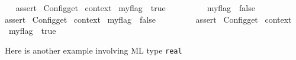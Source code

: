 \begin{isabellebody}
%
\isadelimML
\isanewline
%
\endisadelimML
%
\isatagML
{}\isamarkupfalse%
\ {}\ %
\isaantiq
assert{}%
\endisaantiq
\ {}Config{}get\ %
\isaantiq
context{}%
\endisaantiq
\ my{}flag\ {}\ true{}\ {}%
\endisatagML
{\isafoldML}%
%
\isadelimML
\isanewline
%
\endisadelimML
\isanewline
{}\isamarkupfalse%
\isanewline
{}\isanewline
%
\isadelimproof
\ \ %
\endisadelimproof
%
\isatagproof
{}\isamarkupfalse%
\isanewline
\ \ \ \ \isamarkupfalse%
\ {}{}my{}flag\ {}\ false{}{}%
\endisatagproof
{\isafoldproof}%
%
\isadelimproof
\isanewline
%
\endisadelimproof
%
\isadelimML
\ \ \ \ %
\endisadelimML
%
\isatagML
{}\isamarkupfalse%
\ {}\ %
\isaantiq
assert{}%
\endisaantiq
\ {}Config{}get\ %
\isaantiq
context{}%
\endisaantiq
\ my{}flag\ {}\ false{}\ {}%
\endisatagML
{\isafoldML}%
%
\isadelimML
\isanewline
%
\endisadelimML
%
\isadelimproof
\ \ %
\endisadelimproof
%
\isatagproof
{}\isamarkupfalse%
%
\endisatagproof
{\isafoldproof}%
%
\isadelimproof
\isanewline
%
\endisadelimproof
%
\isadelimML
\ \ %
\endisadelimML
%
\isatagML
{}\isamarkupfalse%
\ {}\ %
\isaantiq
assert{}%
\endisaantiq
\ {}Config{}get\ %
\isaantiq
context{}%
\endisaantiq
\ my{}flag\ {}\ true{}\ {}%
\endisatagML
{\isafoldML}%
%
\isadelimML
\isanewline
%
\endisadelimML
{}\isamarkupfalse%
%
\begin{isamarkuptext}%
Here is another example involving ML type \verb|real|

\end{isamarkuptext}
\end{isabellebody}
